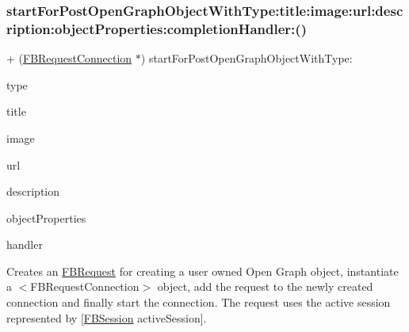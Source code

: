 \subsubsection{\texorpdfstring{start\+For\+Post\+Open\+Graph\+Object\+With\+Type\+:title\+:image\+:url\+:description\+:object\+Properties\+:completion\+Handler\+:()}{startForPostOpenGraphObjectWithType:title:image:url:description:objectProperties:completionHandler:()}\hspace{0.1cm}{\footnotesize\ttfamily [4/5]}}
{\footnotesize\ttfamily + (\hyperlink{interfaceFBRequestConnection}{F\+B\+Request\+Connection} $\ast$) start\+For\+Post\+Open\+Graph\+Object\+With\+Type\+: \begin{DoxyParamCaption}\item[{(N\+S\+String $\ast$)}]{type }\item[{title:(N\+S\+String $\ast$)}]{title }\item[{image:(id)}]{image }\item[{url:(id)}]{url }\item[{description:(N\+S\+String $\ast$)}]{description }\item[{objectProperties:(N\+S\+Dictionary $\ast$)}]{object\+Properties }\item[{completionHandler:(F\+B\+Request\+Handler)}]{handler }\end{DoxyParamCaption}}

Creates an {\ttfamily \hyperlink{interfaceFBRequest}{F\+B\+Request}} for creating a user owned Open Graph object, instantiate a $<$\+F\+B\+Request\+Connection$>$ object, add the request to the newly created connection and finally start the connection. The request uses the active session represented by {\ttfamily \mbox{[}\hyperlink{interfaceFBSession}{F\+B\+Session} active\+Session\mbox{]}}.


